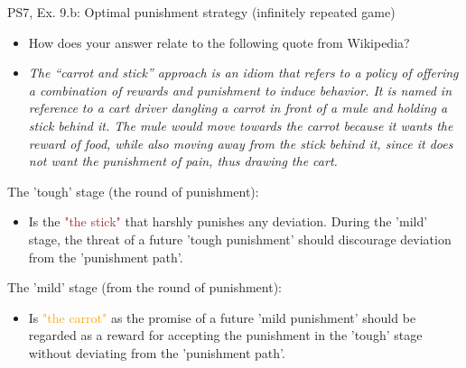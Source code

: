 \begin{frame}{PS7, Ex. 9.b: Optimal punishment strategy (infinitely repeated game)}
    \begin{itemize}
      \item[(b)] How does your answer relate to the following quote from Wikipedia?
      \item[] \textit{The “carrot and stick” approach is an idiom that refers to a policy of offering a combination of rewards and punishment to induce behavior. It is named in reference to a cart driver dangling a carrot in front of a mule and holding a stick behind it. The mule would move towards the carrot because it wants the reward of food, while also moving away from the stick behind it, since it does not want the punishment of pain, thus drawing the cart.}
    \end{itemize}
    \vspace{-4pt}
    \begin{multicols}{2}
      The 'tough' stage (the  round of punishment):
      \begin{itemize}
        \item Is the \textcolor{brown}{"the stick"} that harshly punishes any deviation. During the 'mild' stage, the threat of a future 'tough punishment' should discourage deviation from the 'punishment path'.
      \end{itemize}
      \vfill\null\columnbreak
      The 'mild' stage (from the  round of punishment):
      \begin{itemize}
        \item Is \textcolor{orange}{"the carrot"} as the promise of a future 'mild punishment' should be regarded as a reward for accepting the punishment in the 'tough' stage without deviating from the 'punishment path'.
      \end{itemize}
      \vfill\null
    \end{multicols}
\end{frame}



